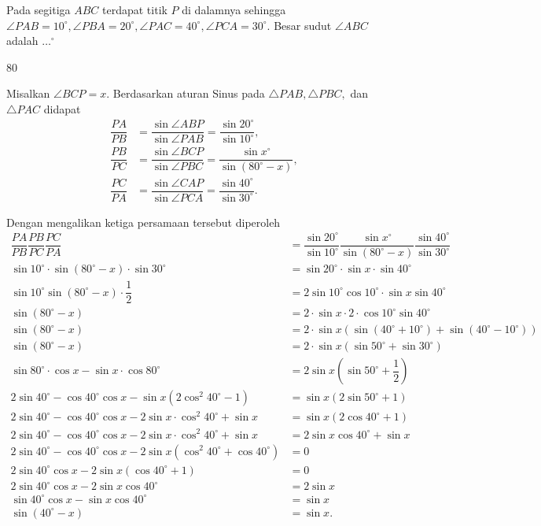 \documentclass[12pt]{scrartcl}
\begin{document}
	\begin{soalbaru}
		Pada segitiga $ABC$ terdapat titik $P$ di dalamnya sehingga $\angle PAB = 10^\circ, \angle PBA = 20^\circ , \angle PAC = 40^\circ, \angle PCA = 30^\circ$. Besar sudut $\angle ABC$ adalah $\dots^\circ$ 
		
		\begin{jawaban}
				$80$
		\end{jawaban}
		\begin{solusi}
		Misalkan $\angle BCP = x$. Berdasarkan aturan Sinus pada $\triangle PAB, \triangle PBC,$ dan $\triangle PAC$ didapat
		\begin{align*}
		\dfrac{PA}{PB} &= \dfrac{\sin \angle ABP}{\sin \angle PAB} = \dfrac{\sin 20^\circ}{\sin 10^\circ}, \\
		\dfrac{PB}{PC} &= \dfrac{\sin \angle BCP}{\sin \angle PBC} = \dfrac{\sin x^\circ}{\sin (80
		^\circ-x)}, \\
		\dfrac{PC}{PA} &= \dfrac{\sin \angle CAP}{\sin \angle PCA} = \dfrac{\sin 40^\circ}{\sin 30^\circ}.
		\end{align*}
		
		Dengan mengalikan ketiga persamaan tersebut diperoleh
		\begin{align*}
		\dfrac{PA}{PB}\dfrac{PB}{PC}\dfrac{PC}{PA}&=\dfrac{\sin 20^\circ}{\sin 10^\circ}\dfrac{\sin x^\circ}{\sin (80^\circ-x)}\dfrac{\sin 40^\circ}{\sin 30^\circ}\\
		\sin 10^\circ \cdot \sin (80^\circ-x)\cdot \sin 30^\circ &= \sin 20^\circ\cdot \sin x \cdot \sin 40^\circ\\
		\sin 10^\circ \sin (80^\circ-x)\cdot \dfrac{1}{2}&=2\sin 10^\circ \cos 10^\circ\cdot \sin x \sin 40^\circ\\
		\sin (80^\circ-x)&=2\cdot\sin x \cdot 2\cdot \cos 10^\circ \sin 40^\circ\\
		\sin(80^\circ-x)&=2\cdot\sin x(\sin(40^\circ+10^\circ)+\sin(40^\circ-10^\circ))\\
		\sin(80^\circ-x)&=2\cdot\sin x(\sin50^\circ+\sin 30^\circ)\\
		\sin 80^\circ\cdot\cos x-\sin x\cdot \cos 80^\circ &= 2\sin x(\sin 50^\circ +\dfrac{1}{2})\\
		2\sin40^\circ-\cos 40^\circ\cos x-\sin x(2\cos^2 40^\circ-1)&=\sin x(2\sin 50^\circ+1)\\
		2\sin40^\circ-\cos 40^\circ\cos x-2\sin x\cdot\cos^2 40^\circ+\sin x &= \sin x (2 \cos 40^\circ+1)\\
		2\sin40^\circ-\cos 40^\circ\cos x-2\sin x\cdot\cos^2 40^\circ+\sin x &= 2\sin x\cos 40^\circ + \sin x\\
		2\sin40^\circ-\cos 40^\circ\cos x-2\sin x(\cos^2 40^\circ+\cos 40^\circ) &= 0\\
		2 \sin 40^\circ \cos x - 2\sin x(\cos 40^\circ+1)&=0\\
		2\sin 40^\circ\cos x-2\sin x\cos 40^\circ &= 2\sin x\\
		\sin 40^\circ\cos x-\sin x\cos 40^\circ &= \sin x\\
		\sin(40^\circ-x)&=\sin x. 
		\end{align*}
		

\end{solusi}
\end{soalbaru}
\end{document}
